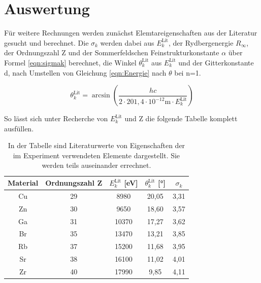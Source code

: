 \documentclass[titlepage = firstcover]{scrartcl}
\begin{document}
    
    \section{Auswertung}
        
        Für weitere Rechnungen werden zunächst Elemtareigenschaften aus der Literatur gesucht und berechnet. Die $\sigma_k$ werden dabei aus $E_k^{\text{Lit}}$, der Rydbergenergie $R_{\infty}$, der 
        Ordnungszahl Z und der Sommerfeldschen Feinstrukturkonstante $\alpha$ über Formel \ref{eqn:sigmak} berechnet, die Winkel $\theta_k^{\text{Lit}}$ aus $E_k^{\text{Lit}}$ und der Gitterkonstante d, nach
        Umstellen von Gleichung \ref{eqn:Energie} nach $\theta$ bei n=1.
        
        \begin{equation*}
          \theta_k^{\text{Lit}} = \arcsin\left(\frac{hc}{2 \cdot 201,4 \cdot 10^{-12} \text{m} \cdot E_k^{\text{Lit}}}\right)
        \end{equation*}
        
        \noindent
        So lässt sich unter Recherche von $E_k^{\text{Lit}}$ und Z die folgende Tabelle komplett ausfüllen.
        \FloatBarrier
        \begin{table}[h]
          \centering
          \caption{In der Tabelle sind Literaturwerte von Eigenschaften der im Experiment verwendeten Elemente dargestellt. Sie werden teils auseinander errechnet.}
          \label{tab:Elemente}
        
          \begin{tabular}{c c c c c}
            \toprule
            {Material}  & {Ordnungszahl Z} & {$E_k^{\text{Lit}}$ [eV]} & {$\theta_k^{\text{Lit}}$ [°]} & {$\sigma_k$} \\ 
            \midrule
            Cu	                &   29           &  8980          &  20,05     &    3,31   \\
            Zn	                &   30           &  9650          &  18,60     &    3,57   \\
            Ga	                &   31           &  10370         &  17,27     &    3,62   \\
            Br	                &   35           &  13470         &  13,21     &    3,85   \\
            Rb	                &   37           &  15200         &  11,68     &    3,95   \\
            Sr	                &   38           &  16100         &  11,02     &    4,01   \\
            Zr	                &   40           &  17990         &  9,85      &    4,11   \\
            \bottomrule
          \end{tabular}
        \end{table}
  
\end{document}
